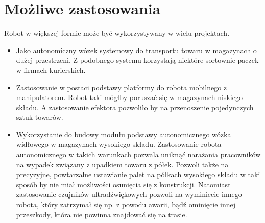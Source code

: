\section{Możliwe zastosowania}
Robot w większej formie może być wykorzystywany w wielu projektach.
\begin{itemize}
    \item Jako autonomiczny wózek systemowy do transportu towaru w magazynach o dużej przestrzeni. Z podobnego systemu korzystają niektóre sortownie paczek w firmach kurierskich.
    \item Zastosowanie w postaci podstawy platformy do robota mobilnego z manipulatorem. Robot taki mógłby poruszać się w magazynach niskiego składu. A zastosowanie efektora pozwoliło by na przenoszenie pojedynczych sztuk towarów.
    \item Wykorzystanie do budowy modułu podstawy autonomicznego wózka widłowego w magazynach wysokiego składu. Zastosowanie robota autonomicznego w takich warunkach pozwala uniknąć narażania pracowników na wypadek związany z upadkiem towaru z półek. Pozwoli także na precyzyjne, powtarzalne ustawianie palet na półkach wysokiego składu w taki sposób by nie miał możliwości osunięcia się z konstrukcji. Natomiast zastosowanie czujników ultradźwiękowych pozwoli na wyminiecie innego robota, który zatrzymał się np. z powodu awarii, bądź ominięcie innej przeszkody, która nie powinna znajdować się na trasie.
\end{itemize}